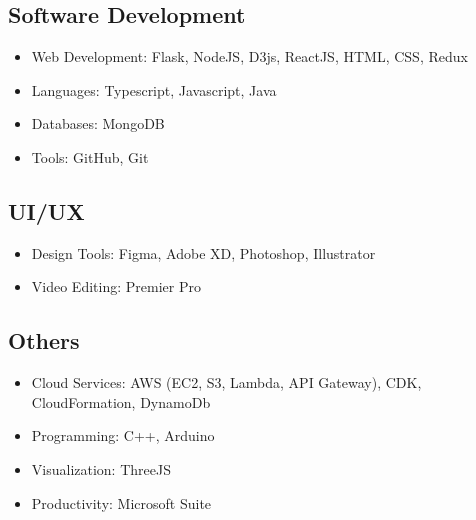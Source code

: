 \documentclass[10pt,a4paper]{article}
\begin{document}
\subsection*{Software Development}
\begin{itemize}[noitemsep]
    \item Web Development: Flask, NodeJS, D3js, ReactJS, HTML, CSS, Redux
    \item Languages: Typescript, Javascript, Java
    \item Databases: MongoDB
    \item Tools: GitHub, Git
\end{itemize}

\subsection*{UI/UX}
\begin{itemize}[noitemsep]
    \item Design Tools: Figma, Adobe XD, Photoshop, Illustrator
    \item Video Editing: Premier Pro
\end{itemize}

\subsection*{Others}
\begin{itemize}[noitemsep]
    \item Cloud Services: AWS (EC2, S3, Lambda, API Gateway), CDK, CloudFormation, DynamoDb
    \item Programming: C++, Arduino
    \item Visualization: ThreeJS
    \item Productivity: Microsoft Suite
\end{itemize}
\end{document}
